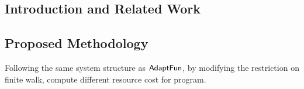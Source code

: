 \subsection{Introduction and Related Work}
\label{subsec:cfl-backgroung}

\subsection{Proposed Methodology}
\label{subsec:cfl-methodology}
Following the same system structure as $\textsf{AdaptFun}$,
by modifying the restriction on finite walk, compute different resource cost for program.

